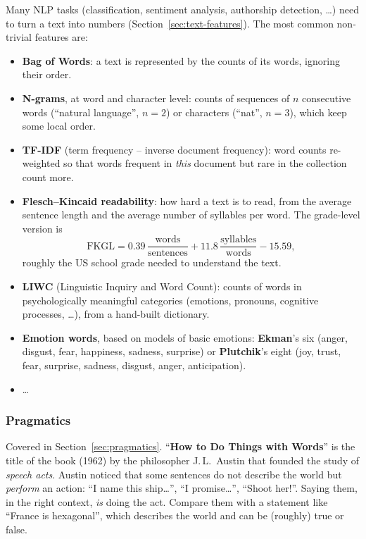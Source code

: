 Many NLP tasks (classification, sentiment analysis, authorship detection, \ldots) need
to turn a text into numbers (Section~\ref{sec:text-features}). The most common non-trivial features are:
\begin{itemize}[nosep]
  \item \textbf{Bag of Words}: a text is represented by the counts of its words,
        ignoring their order.
  \item \textbf{N-grams}, at word and character level: counts of sequences of $n$
        consecutive words (``natural language'', $n=2$) or characters (``nat'', $n=3$),
        which keep some local order.
  \item \textbf{TF-IDF} (term frequency -- inverse document frequency): word counts
        re-weighted so that words frequent in \emph{this} document but rare in the
        collection count more.
  \item \textbf{Flesch--Kincaid readability}: how hard a text is to read, from the
        average sentence length and the average number of syllables per word. The
        grade-level version is
        \[
          \text{FKGL} = 0.39\,\frac{\text{words}}{\text{sentences}}
                      + 11.8\,\frac{\text{syllables}}{\text{words}} - 15.59,
        \]
        roughly the US school grade needed to understand the text.
  \item \textbf{LIWC} (Linguistic Inquiry and Word Count): counts of words in
        psychologically meaningful categories (emotions, pronouns, cognitive processes,
        \ldots), from a hand-built dictionary.
  \item \textbf{Emotion words}, based on models of basic emotions: \textbf{Ekman}'s six
        (anger, disgust, fear, happiness, sadness, surprise) or \textbf{Plutchik}'s eight
        (joy, trust, fear, surprise, sadness, disgust, anger, anticipation).
  \item \ldots
\end{itemize}

\subsubsection{Pragmatics}

Covered in Section~\ref{sec:pragmatics}.
``\textbf{How to Do Things with Words}'' is the title of the book (1962) by the
philosopher J.\,L.~Austin that founded the study of \emph{speech acts}. Austin noticed
that some sentences do not describe the world but \emph{perform} an action:
``I name this ship\ldots'', ``I promise\ldots'', ``Shoot her!''. Saying them, in the right
context, \emph{is} doing the act. Compare them with a statement like ``France is
hexagonal'', which describes the world and can be (roughly) true or false.

